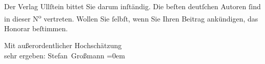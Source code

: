\pstart
           Der Verlag Ullſtein bittet Sie darum inſtändig.
               Die beſten deutſchen Autoren ſind in dieser N\textsuperscript{o} vertreten.
               Wollen Sie ſelbſt, wenn Sie Ihren Beitrag ankündigen, das Honorar beſtimmen.\pend
           
\pstart
           Mit außerordentlicher Hochschätzung{\\[\baselineskip]}sehr ergeben: \spacefill\mbox{Stefan
                  Großmann}\pend
           \leftskip=0em{}\endnumbering{}  
      